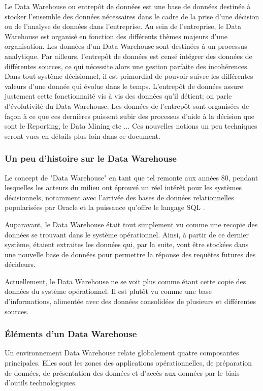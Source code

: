 \documentclass[12pt,a4wide,twoside]{report}
\begin{document}
Le Data Warehouse ou entrepôt de données est une base de données destinée à stocker l’ensemble des données nécessaires dans le cadre de la prise d’une décision ou de l’analyse de données dans l’entreprise.\newline
Au sein de l'entreprise, le Data  Warehouse est organisé en fonction des différents thèmes majeurs d'une organisation. Les données d'un Data Warehouse sont destinées à un processus analytique. Par ailleurs, l'entrepôt de données est censé intégrer des données de différentes sources, ce qui nécessite alors une gestion parfaite des incohérences.\newline
Dans tout système décisionnel, il est primordial de pouvoir suivre les différentes valeurs d'une donnée qui évolue dans le temps. L'entrepôt de données assure justement cette fonctionnaité vis à vis des données qu'il détient; on parle d'évolutivité du Data Warehouse.\newline
Les données de l'entrepôt sont organisées de façon à ce que ces dernières puissent subir des processus d'aide à la décision que sont le Reporting, le Data Mining etc ... Ces nouvelles notions un peu techniques seront vues en détails plus loin dans ce document. 
\subsubsection{Un peu d'histoire sur le Data Warehouse}
Le concept de "Data Warehouse" en tant que tel remonte aux années 80, pendant lesquelles les acteurs du milieu ont éprouvé un réel intérêt pour les systèmes décisionnels, notamment avec l'arrivée des bases de données relationnelles popularisées par Oracle et la puissance qu'offre le langage SQL \cite{misc9}.


Auparavant, le Data Warehouse était tout simplement vu comme une recopie des données se trouvant dans le système opérationnel. Ainsi, à partir de ce dernier système, étaient extraites les données qui, par la suite, vont être stockées dans une nouvelle base de données pour permettre la réponse des requêtes futures des décideurs.


Actuellement, le Data Warehouse ne se voit plus comme étant cette copie des données du système opérationnel. Il est plutôt vu comme une base d'informations, alimentée avec des données consolidées de plusieurs et différentes sources. 

 \subsubsection{Éléments d'un Data Warehouse}
 Un environnement Data Warehouse relate globalement quatre composantes principales. Elles sont les zones des\newline
 applications opérationnelles, de préparation de données, de présentation des données et d'accès aux données par le biais d'outils technologiques.
 
\end{document}
